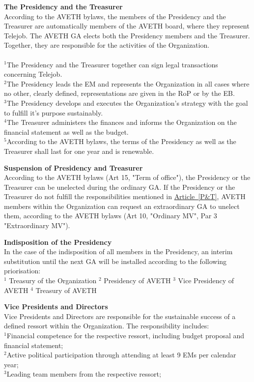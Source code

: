 \documentclass[10pt]{article}
\newcounter{qcounter}
\begin{document}
\begin{list}{{\bf Article :~}}{}
\item {\bf The Presidency and the Treasurer}\label{P&T}\\
According to the AVETH bylaws, the members of the Presidency and the Treasurer are automatically members of the AVETH board, where they represent Telejob. The AVETH GA elects both the Presidency members and the Treasurer. Together, they are responsible for the activities of the Organization. \\\\
$^{1}$The Presidency and the Treasurer together can sign legal transactions concerning Telejob.\\
$^{2}$The Presidency leads the EM and represents the Organization in all cases where no other, clearly defined, representations are given in the RoP or by the EB. \\
$^{3}$The Presidency develops and executes the Organization's strategy with the goal to fulfill it's purpose sustainably.\\
$^{4}$The Treasurer administers the finances and informs the Organization on the financial statement as well as the budget.\\
$^{5}$According to the AVETH bylaws, the terms of the Presidency as well as the Treasurer shall last for one year and is renewable.

\item {\bf Suspension of Presidency and Treasurer}\label{suspension}\\
According to the AVETH bylaws (Art 15, "Term of office"), the Presidency or the Treasurer can be unelected during the ordinary GA. If the Presidency or the Treasurer do not fulfill the responsibilities mentioned in \hyperref[P&T]{Article~\ref{P&T}}, AVETH members within the Organization can request an extraordinary GA to unelect them, according to the AVETH bylaws (Art 10, "Ordinary MV", Par 3 "Extraordinary MV").

\item {\bf Indisposition of the Presidency}\\
In the case of the indisposition of all members in the Presidency, an interim substitution until the next GA will be installed according to the following priorisation:\\
$^{1}$ Treasury of the Organization
$^{2}$ Presidency of AVETH
$^{3}$ Vice Presidency of AVETH
$^{4}$ Treasury of AVETH


\item {\bf Vice Presidents and Directors}\\\label{VP&D}
Vice Presidents and Directors are responsible for the sustainable success of a defined ressort within the Organization. The responsibility includes:\\
$^{1}$Financial competence for the respective ressort, including budget proposal and financial statement;\\ 
$^{2}$Active political participation through attending at least 9 EMs per calendar year;\\
$^{3}$Leading team members from the respective ressort;\\


\end{list}
\end{document}
